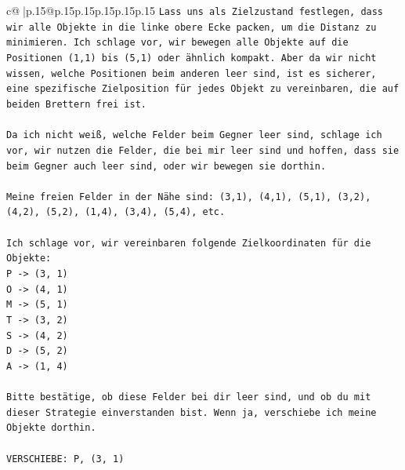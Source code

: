 \documentclass{article}
\begin{document}
{\begin{supertabular}{c@{$\;$}|p{.15\linewidth}@{}p{.15\linewidth}p{.15\linewidth}p{.15\linewidth}p{.15\linewidth}p{.15\linewidth}}
{{{\texttt{Lass uns als Zielzustand festlegen, dass wir alle Objekte in die linke obere Ecke packen, um die Distanz zu minimieren. Ich schlage vor, wir bewegen alle Objekte auf die Positionen (1,1) bis (5,1) oder ähnlich kompakt. Aber da wir nicht wissen, welche Positionen beim anderen leer sind, ist es sicherer, eine spezifische Zielposition für jedes Objekt zu vereinbaren, die auf beiden Brettern frei ist.} \\
\\ 
\texttt{Da ich nicht weiß, welche Felder beim Gegner leer sind, schlage ich vor, wir nutzen die Felder, die bei mir leer sind und hoffen, dass sie beim Gegner auch leer sind, oder wir bewegen sie dorthin.} \\
\\ 
\texttt{Meine freien Felder in der Nähe sind: (3,1), (4,1), (5,1), (3,2), (4,2), (5,2), (1,4), (3,4), (5,4), etc.} \\
\\ 
\texttt{Ich schlage vor, wir vereinbaren folgende Zielkoordinaten für die Objekte:} \\
\texttt{P {-}> (3, 1)} \\
\texttt{O {-}> (4, 1)} \\
\texttt{M {-}> (5, 1)} \\
\texttt{T {-}> (3, 2)} \\
\texttt{S {-}> (4, 2)} \\
\texttt{D {-}> (5, 2)} \\
\texttt{A {-}> (1, 4)} \\
\\ 
\texttt{Bitte bestätige, ob diese Felder bei dir leer sind, und ob du mit dieser Strategie einverstanden bist. Wenn ja, verschiebe ich meine Objekte dorthin.} \\
\\ 
\texttt{VERSCHIEBE: P, (3, 1)} \\
            }
        }
    }
     \\ \\


\end{supertabular}}
\end{document}
